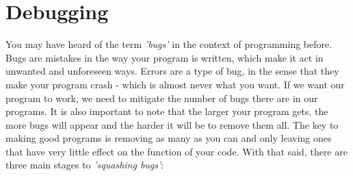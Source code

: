 \documentclass{article}
\begin{document}
\section{Debugging}
You may have heard of the term \textit{'bugs'} in the context of programming before. Bugs are mistakes in the way your program is written, which make it act in unwanted and unforeseen ways. Errors are a type of bug, in the sense that they make your program crash - which is almost never what you want. If we want our program to work, we need to mitigate the number of bugs there are in our programs. It is also important to note that the larger your program gets, the more bugs will appear and the harder it will be to remove them all. The key to making good programs is removing as many as you can and only leaving ones that have very little effect on the function of your code. With that said, there are three main stages to \textit{'squashing bugs'}:
\end{document}
